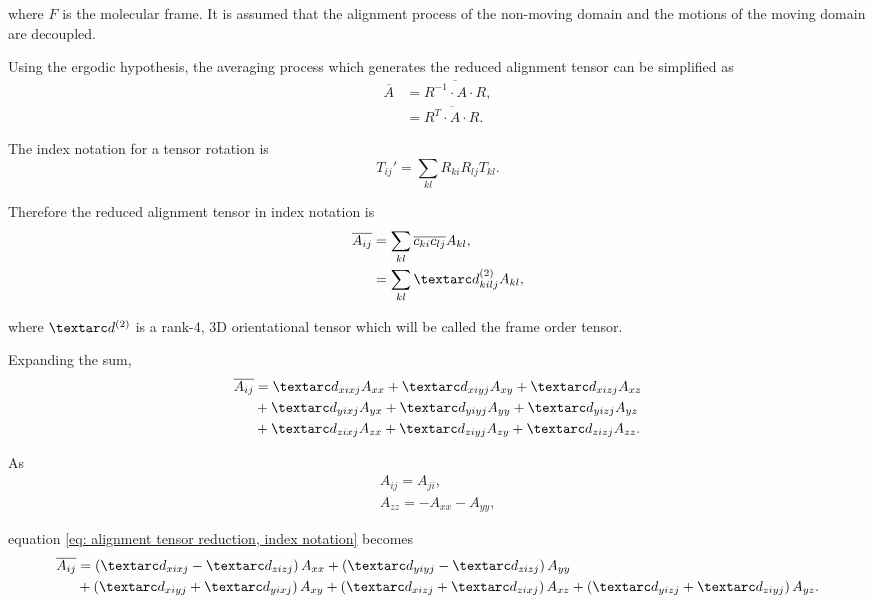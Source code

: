 where $F$ is the molecular frame.
It is assumed that the alignment process of the non-moving domain and the motions of the moving domain are decoupled.

Using the ergodic hypothesis, the averaging process which generates the reduced alignment tensor can be simplified as
\begin{subequations}
\begin{align}
    \overline A &= \overline{R^{-1} \cdot A \cdot R} , \\
                &= \overline{R^T \cdot A \cdot R} .
\end{align}
\end{subequations}

The index notation for a tensor rotation is
\begin{equation}
    T_{ij}' = \sum_{kl} R_{ki} R_{lj} T_{kl} .
\end{equation}

Therefore the reduced alignment tensor in index notation is
\begin{align}
    \overline{A_{ij}}
        &= \sum_{kl} \overline{c_{ki}c_{lj}} A_{kl} , \\
        &= \sum_{kl} \FOtwo_{kilj} A_{kl} ,
\end{align}

where $\FOtwo$ is a rank-4, 3D orientational tensor which will be called the frame order tensor.

Expanding the sum,
\begin{align} \label{eq: alignment tensor reduction, index notation}
    \overline{A_{ij}} & = \FO_{xixj} A_{xx} + \FO_{xiyj} A_{xy} + \FO_{xizj} A_{xz} \nonumber \\
                      & + \FO_{yixj} A_{yx} + \FO_{yiyj} A_{yy} + \FO_{yizj} A_{yz} \nonumber \\
                      & + \FO_{zixj} A_{zx} + \FO_{ziyj} A_{zy} + \FO_{zizj} A_{zz} .
\end{align}

As
\begin{subequations}
\begin{gather}
    A_{ij} = A_{ji} , \\
    A_{zz} = - A_{xx} - A_{yy} ,
\end{gather}
\end{subequations}

equation \ref{eq: alignment tensor reduction, index notation} becomes
\begin{align}
    \overline{A_{ij}} & = \left( \FO_{xixj} - \FO_{zizj} \right) A_{xx}  +  \left( \FO_{yiyj} - \FO_{zizj} \right) A_{yy} \nonumber \\
                      & + \left( \FO_{xiyj} + \FO_{yixj} \right) A_{xy}  +  \left( \FO_{xizj} + \FO_{zixj} \right) A_{xz}  +  \left( \FO_{yizj} + \FO_{ziyj} \right) A_{yz} .
\end{align}


